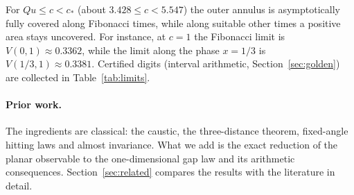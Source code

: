 \documentclass[11pt]{amsart}
\theoremstyle{remark}
\begin{document}
For $Qu\le c<c_*$ (about $3.428\le c<5.547$) the outer annulus is asymptotically fully
covered along Fibonacci times, while along suitable other times a positive area stays
uncovered. For instance, at $c=1$ the Fibonacci limit is $V(0,1)\approx0.3362$, while the
limit along the phase $x=1/3$ is $V(1/3,1)\approx0.3381$. Certified digits (interval
arithmetic, Section~\ref{sec:golden}) are collected in Table~\ref{tab:limits}.

\paragraph{Prior work.} The ingredients are classical: the caustic, the three-distance
theorem, fixed-angle hitting laws and almost invariance. What we add is the exact reduction of
the planar observable to the one-dimensional gap law and its arithmetic consequences.
Section~\ref{sec:related} compares the results with the literature in detail.
\end{document}
